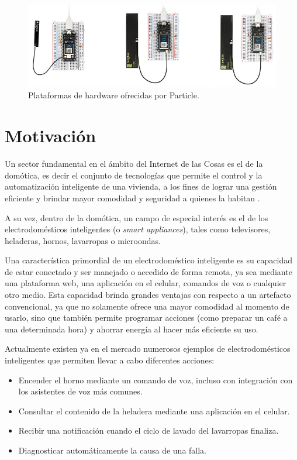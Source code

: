 \begin{figure}[h]
\centering
\includegraphics[scale=0.4]{./Figures/particle_iot.png}
\caption[Plataformas de hardware ofrecidas por Particle.]{Plataformas de hardware ofrecidas por Particle.\footnotemark}
\label{fig:particle_iot}
\end{figure}



\section{Motivación{}}

Un sector fundamental en el ámbito del Internet de las Cosas es el de la domótica, es decir el conjunto de tecnologías que permite el control y la automatización inteligente de una vivienda, a los fines de lograr una gestión eficiente y brindar mayor comodidad y seguridad a quienes la habitan \citep{6}.

A su vez, dentro de la domótica, un campo de especial interés es el de los electrodomésticos inteligentes (o \emph{smart appliances}), tales como televisores, heladeras, hornos, lavarropas o microondas. 

Una característica primordial de un electrodoméstico inteligente es su capacidad de
estar conectado y ser manejado o accedido de forma remota, ya sea mediante una plataforma web, una aplicación en el celular, comandos de voz o cualquier otro medio. Esta capacidad brinda grandes ventajas con respecto a un artefacto convencional, ya que no solamente ofrece una mayor comodidad al momento de usarlo, sino que también permite programar acciones (como preparar un café a una determinada hora) y ahorrar energía al hacer más eficiente su uso.

Actualmente existen ya en el mercado numerosos ejemplos de electrodomésticos inteligentes que permiten llevar a cabo diferentes acciones:
\begin{itemize}
	\item Encender el horno mediante un comando de voz, incluso con integración con los asistentes de voz más comunes.
	\item Consultar el contenido de la heladera mediante una aplicación en el celular.
	\item Recibir una notificación cuando el ciclo de lavado del lavarropas finaliza.
	\item Diagnosticar automáticamente la causa de una falla.
\end{itemize}

